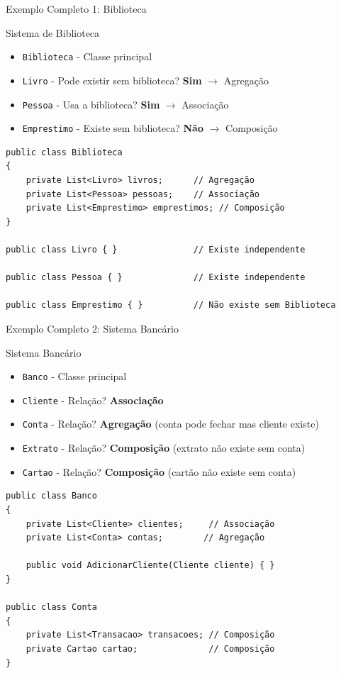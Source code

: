 \documentclass[aspectratio=169]{beamer}
\begin{document}
\begin{frame}{Exemplo Completo 1: Biblioteca}
\begin{block}{Sistema de Biblioteca}
\begin{itemize}
\item \texttt{Biblioteca} - Classe principal
\item \texttt{Livro} - Pode existir sem biblioteca? \textbf{Sim} $\rightarrow$ Agregação
\item \texttt{Pessoa} - Usa a biblioteca? \textbf{Sim} $\rightarrow$ Associação
\item \texttt{Emprestimo} - Existe sem biblioteca? \textbf{Não} $\rightarrow$ Composição
\end{itemize}
\end{block}

\vspace{0.5cm}
\begin{lstlisting}[basicstyle=\tiny]
public class Biblioteca
{
    private List<Livro> livros;      // Agregação
    private List<Pessoa> pessoas;    // Associação
    private List<Emprestimo> emprestimos; // Composição
}

public class Livro { }               // Existe independente

public class Pessoa { }              // Existe independente

public class Emprestimo { }          // Não existe sem Biblioteca
\end{lstlisting}
\end{frame}

\begin{frame}{Exemplo Completo 2: Sistema Bancário}
\begin{block}{Sistema Bancário}
\begin{itemize}
\item \texttt{Banco} - Classe principal
\item \texttt{Cliente} - Relação? \textbf{Associação}
\item \texttt{Conta} - Relação? \textbf{Agregação} (conta pode fechar mas cliente existe)
\item \texttt{Extrato} - Relação? \textbf{Composição} (extrato não existe sem conta)
\item \texttt{Cartao} - Relação? \textbf{Composição} (cartão não existe sem conta)
\end{itemize}
\end{block}

\vspace{0.5cm}
\begin{lstlisting}[basicstyle=\tiny]
public class Banco
{
    private List<Cliente> clientes;     // Associação
    private List<Conta> contas;        // Agregação
    
    public void AdicionarCliente(Cliente cliente) { }
}

public class Conta
{
    private List<Transacao> transacoes; // Composição
    private Cartao cartao;              // Composição
}
\end{lstlisting}
\end{frame}
\end{document}
